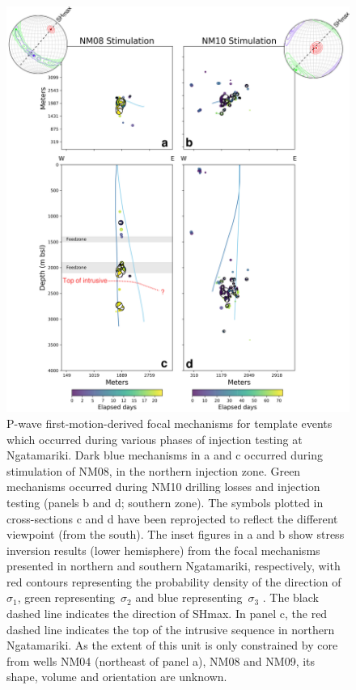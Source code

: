 \begin{figure}[h!]
\begin{center}
\includegraphics[width=0.90\columnwidth]{Chapter_3_Nga/figures/Nga_stims_map_depth_beachballs_stress_final_labels_10-5_intrusive_colored/Nga_stims_map_depth_beachballs_stress_GC_labels_12-5_intrusive_colored_dpi300}
\caption[Focal mechanisms and stress inversions at NM08 and NM10]{{
P-wave first-motion-derived focal mechanisms for template events which
occurred during various phases of injection testing at Ngatamariki. Dark
blue mechanisms in a and c occurred during \gls{stimulation} of NM08, in the
northern injection zone. Green mechanisms occurred during NM10 drilling
losses and injection testing (panels b and d; southern zone). The
symbols plotted in cross-sections c and d have been reprojected to
reflect the different viewpoint (from the south). The inset figures in a
and b show stress inversion results (lower hemisphere) from the focal
mechanisms presented in northern and southern Ngatamariki, respectively,
with red contours representing the probability density of the direction
of~\(\sigma_1\), green representing~\(\sigma_2\) and blue
representing~\(\sigma_3\) . The black dashed line indicates the
direction of SHmax. In panel c, the red dashed line indicates the top of
the intrusive sequence in northern Ngatamariki. As the extent of this
unit is only constrained by core from wells NM04 (northeast of panel a),
NM08 and NM09, its shape, volume and orientation are unknown.
{\label{532034}}%
}}
\end{center}
\end{figure}

